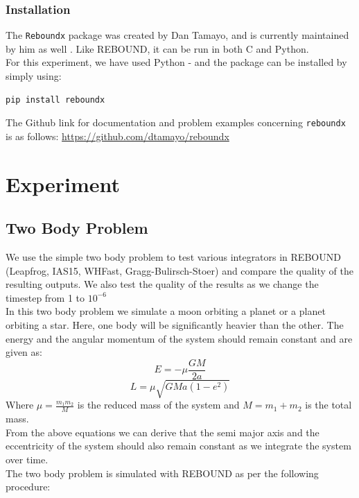 \documentclass[12pt,a4paper]{article}
\begin{document}
\subsubsection{Installation}
The \texttt{Reboundx} package was created by Dan Tamayo, and is currently maintained by him as well \cite{Tamayo_2019}. Like REBOUND, it can be run in both C and Python. \\
For this experiment, we have used Python - and the package can be installed by simply using:
\begin{verbatim}
pip install reboundx
\end{verbatim}
The Github link for documentation and problem examples concerning \texttt{reboundx} is as follows: \href{https://github.com/dtamayo/reboundx}{https://github.com/dtamayo/reboundx}

\section{Experiment}
\subsection{Two Body Problem}
We use the simple two body problem to test various integrators in REBOUND (Leapfrog, IAS15, WHFast, Gragg-Bulirsch-Stoer) and compare the quality of the resulting outputs.
We also test the quality of the results as we change the timestep from 1 to $10^{-6}$\\
In this two body problem we simulate a moon orbiting a planet or a planet orbiting a star. Here, one body will be significantly heavier than the other. 
The energy and the angular momentum of the system should remain constant and are given as: 
\begin{equation}
   E = -\mu \frac{GM}{2a}
\end{equation}
\begin{equation}
  L = \mu \sqrt{GMa(1-e^2)}
\end{equation}
Where $\mu = \frac{m_1m_2}{M}$ is the reduced mass of the system and $M=m_1+m_2$ is the total mass.\\
From the above equations we can derive that the semi major axis and the eccentricity of the system should also remain constant as we integrate the system over time.\\
The two body problem is simulated with REBOUND as per the following procedure:
\end{document}
